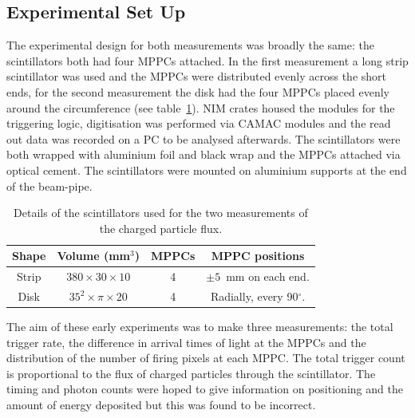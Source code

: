 \subsection{Experimental Set Up} %
\label{sec:experimental_set_up_charged}
The experimental design for both measurements was broadly the same: the scintillators both had four MPPCs attached. In the first measurement a long strip scintillator was used and the MPPCs were distributed evenly across the short ends, for the second measurement the disk had the four MPPCs placed evenly around the circumference (see table~\ref{tab:charged_particle_flux_scint_details}). NIM crates housed the modules for the triggering logic, digitisation was performed via CAMAC modules and the read out data was recorded on a PC to be analysed afterwards. The scintillators were both wrapped with aluminium foil and black wrap and the MPPCs attached via optical cement. The scintillators were mounted on aluminium supports at the end of the beam-pipe.
\begin{table}[hptb]
  \begin{center}
    \begin{tabular}{c|c|c|c}
      Shape  &  Volume (mm\(^3\))           &  MPPCs  &  MPPC positions                    \\
      \hline
      Strip  &  \(380 \times30\times10\)    &  4      &  \( \pm 5 \)~mm on each end.       \\
      Disk   &  \( 35^2\times\pi\times20\)  &  4      &  Radially, every 90\( ^{\circ} \). \\
    \end{tabular}
  \end{center}
  \caption{Details of the scintillators used for the two measurements of the charged particle flux.}
  \label{tab:charged_particle_flux_scint_details}
\end{table}

The aim of these early experiments was to make three measurements: the total trigger rate, the difference in arrival times of light at the MPPCs and the distribution of the number of firing pixels at each MPPC. The total trigger count is proportional to the flux of charged particles through the scintillator. The timing and photon counts were hoped to give information on positioning and the amount of energy deposited but this was found to be incorrect.


